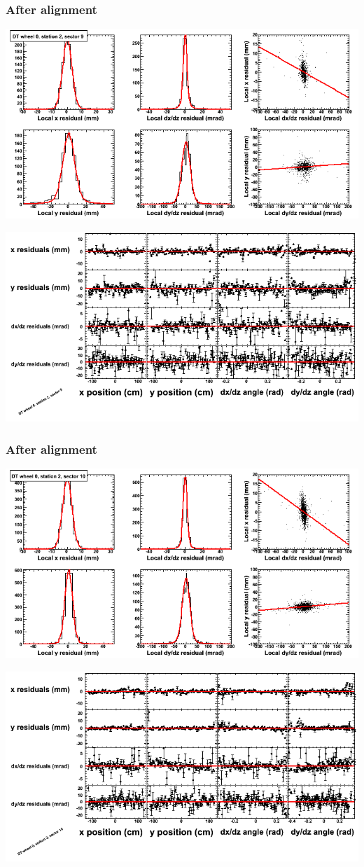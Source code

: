 \documentclass[compress]{beamer}
\begin{document}
\begin{frame}
\frametitle{After alignment}
\includegraphics[width=0.7\linewidth]{NOV4_fitfunctions/MBwhCst2sec09_bellcurves.png}

\includegraphics[width=0.7\linewidth]{NOV4_fitfunctions/MBwhCst2sec09_polynomials.png}
\end{frame}

\begin{frame}
\frametitle{After alignment}
\includegraphics[width=0.7\linewidth]{NOV4_fitfunctions/MBwhCst2sec10_bellcurves.png}

\includegraphics[width=0.7\linewidth]{NOV4_fitfunctions/MBwhCst2sec10_polynomials.png}
\end{frame}
\end{document}
